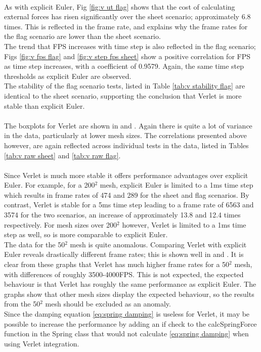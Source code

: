 \\As with explicit Euler, Fig \ref{fig:v ut flag} shows that the cost of calculating external forces has risen significantly over the sheet scenario; approximately 6.8 times. This is reflected in the frame rate, and explains why the frame rates for the flag scenario are lower than the sheet scenario.
\\The trend that FPS increases with time step is also reflected in the flag scenario; Figs \ref{fig:v fps flag} and \ref{fig:v step fps sheet} show a positive correlation for FPS as time step increases, with a coefficient of 0.9579. Again, the same time step thresholds as explicit Euler are observed.
\\The stability of the flag scenario tests, listed in Table \ref{tab:v stability flag} are identical to the sheet scenario, supporting the conclusion that Verlet is more stable than explicit Euler.
\\\\The boxplots for Verlet are shown in  and . Again there is quite a lot of variance in the data, particularly at lower mesh sizes. The correlations presented above however, are again reflected across individual tests in the data, listed in Tables \ref{tab:v raw sheet} and \ref{tab:v raw flag}.
\\\\Since Verlet is much more stable it offers performance advantages over explicit Euler. For example, for a 200$^{2}$ mesh, explicit Euler is limited to a 1ms time step which results in frame rates of 474 and 289 for the sheet and flag scenarios. By contrast, Verlet is stable for a 5ms time step leading to a frame rate of 6563 and 3574 for the two scenarios, an increase of approximately 13.8 and 12.4 times respectively. For mesh sizes over 200$^{2}$ however, Verlet is limited to a 1ms time step as well, so is more comparable to explicit Euler.
\\The data for the 50$^{2}$ mesh is quite anomalous. Comparing Verlet with explicit Euler reveals drastically different frame rates; this is shown well in  and . It is clear from these graphs that Verlet has much higher frame rates for a 50$^{2}$ mesh, with differences of roughly 3500-4000FPS. This is not expected, the expected behaviour is that Verlet has roughly the same performance as explicit Euler. The graphs show that other mesh sizes display the expected behaviour, so the results from the 50$^{2}$ mesh should be excluded as an anomaly.
\\Since the damping equation \ref{eq:spring damping} is useless for Verlet, it may be possible to increase the performance by adding an if check to the calcSpringForce function in the Spring class that would not calculate \ref{eq:spring damping} when using Verlet integration.

